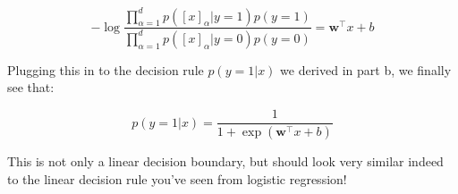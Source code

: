 \documentclass[a4paper]{article}
\begin{document}
\begin{equation*}
-\log\frac{\prod_{\alpha=1}^{d} p([x]_{\alpha}|y=1)p(y=1)}{\prod_{\alpha=1}^{d} p([x]_{\alpha}|y=0)p(y=0)} = \mathbf{w}^{\top}x+b
\end{equation*}

Plugging this in to the decision rule $p(y=1|x)$ we derived in part b, we finally see that:

\begin{equation*}
	p(y=1|x) = \frac{1}{1+\exp\left(\mathbf{w}^{\top}x+b\right)}
\end{equation*}

This is not only a linear decision boundary, but should look very similar indeed to the linear decision rule you've seen from logistic regression!
\end{document}
